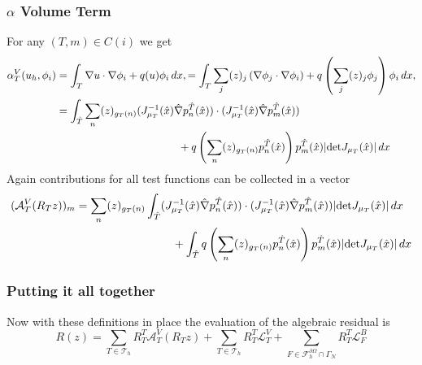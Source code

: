 \documentclass[a4paper,12pt]{article}
\begin{document}
\subsubsection*{$\alpha$ Volume Term}

For any $(T,m)\in C(i)$ we get
\begin{equation*}
\begin{split}
\alpha_T^V(u_h,\phi_i) &= \int_T \nabla u \cdot \nabla \phi_i + q(u) \phi_i \,dx,
= \int_T \sum_j (z)_j \left(\nabla \phi_j \cdot \nabla \phi_i \right) 
+ q\left( \sum_j (z)_j \phi_j \right) \phi_i \,dx,\\
&= \int_{\hat T} \sum_{n} (z)_{g_T(n)} (J_{\mu_T}^{-1}(\hat x) \hat\nabla p_n^{\hat T}(\hat x) )
\cdot (J_{\mu_T}^{-1}(\hat x) \hat\nabla p_m^{\hat T}(\hat x) ) \\
&\hspace{40mm}+ q\left( \sum_n (z)_{g_T(n)} p_n^{\hat T}(\hat x) \right) p_m^{\hat T}(\hat x) 
|\text{det} J_{\mu_T}(\hat x)| \,dx
\end{split}
\end{equation*}
Again contributions for all test functions can be collected in a vector
\begin{equation*}
\begin{split}
(\mathcal{A}_T^V(R_T z))_m &=
\sum_{n} (z)_{g_T(n)} \int_{\hat T} (J_{\mu_T}^{-1}(\hat x) \hat\nabla p_n^{\hat T}(\hat x) )
\cdot (J_{\mu_T}^{-1}(\hat x) \hat\nabla p_m^{\hat T}(\hat x) ) |\text{det} J_{\mu_T}(\hat x)| \,dx\\
&\hspace{30mm}+ \int_{\hat T} q\left( \sum_n (z)_{g_T(n)} p_n^{\hat T}(\hat x) \right) p_m^{\hat T}(\hat x) 
|\text{det} J_{\mu_T}(\hat x)| \,dx
\end{split}
\end{equation*}


\subsubsection*{Putting it all together}

Now with these definitions in place the evaluation of the algebraic residual is
\begin{equation}
R(z) = 
\sum_{T\in\mathcal{T}_h} R_T^T \mathcal{A}_T^V(R_T z)
  + \sum_{T\in\mathcal{T}_h} R_T^T \mathcal{L}_T^V
 + \sum_{F\in\mathcal{F}_h^{\partial\Omega}\cap\Gamma_N} R_T^T \mathcal{L}_F^B
\label{eq:FinalResidualEvaluation}
\end{equation}
\end{document}
